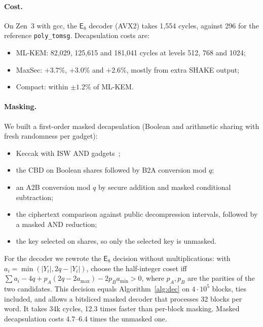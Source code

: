 \documentclass[11pt,a4paper]{article}
\theoremstyle{definition}
\theoremstyle{remark}
\newcommand{\E}{\mathsf{E}_8}
\begin{document}
\paragraph{Cost.} On Zen~3 with gcc, the $\E$ decoder (AVX2) takes 1{,}554 cycles, against 296 for the reference \texttt{poly\_tomsg}. Decapsulation costs are:
\begin{itemize}[leftmargin=*,itemsep=1pt]
\item ML-KEM: 82{,}029, 125{,}615 and 181{,}041 cycles at levels 512, 768 and 1024;
\item MaxSec: $+3.7\%$, $+3.0\%$ and $+2.6\%$, mostly from extra SHAKE output;
\item Compact: within $\pm1.2\%$ of ML-KEM.
\end{itemize}

\paragraph{Masking.} We built a first-order masked decapsulation (Boolean and arithmetic sharing with fresh randomness per gadget):
\begin{itemize}[leftmargin=*,itemsep=1pt]
\item Keccak with ISW AND gadgets~\cite{isw};
\item the CBD on Boolean shares followed by B2A conversion mod $q$;
\item an A2B conversion mod $q$ by secure addition and masked conditional subtraction;
\item the ciphertext comparison against public decompression intervals, followed by a masked AND reduction;
\item the key selected on shares, so only the selected key is unmasked.
\end{itemize}
For the decoder we rewrote the $\E$ decision without multiplications: with $a_i=\min(|Y_i|,2q-|Y_i|)$, choose the half-integer coset iff $\sum a_i-4q+p_A(2q-2a_{\max})-2p_Ba_{\min}>0$, where $p_A,p_B$ are the parities of the two candidates. This decision equals Algorithm~\ref{alg:dec} on $4\cdot10^5$ blocks, ties included, and allows a bitsliced masked decoder that processes 32 blocks per word. It takes 34k cycles, 12.3 times faster than per-block masking. Masked decapsulation costs 4.7--6.4 times the unmasked one.
\end{document}
